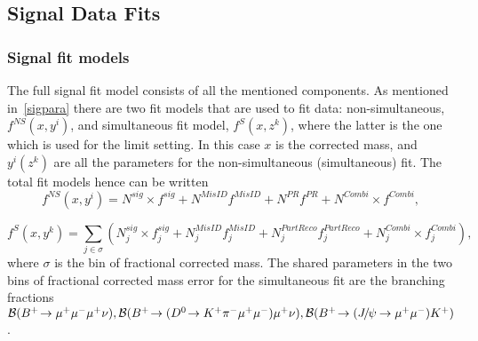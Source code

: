 %
%
\subsection{Signal Data Fits}
\label{fitsens}


\subsubsection{Signal fit models}
The full signal fit model consists of all the mentioned components. As mentioned in~\autoref{sigpara} there are two fit models that are used to fit data: non-simultaneous, $f^{NS}(x,y^{i})$, and simultaneous fit model, $f^{S}(x,{z^{k}})$, where the latter is the one which is used for the limit setting. In this case $x$ is the corrected mass, and $y^{i}(z^{k})$ are all the parameters for the non-simultaneous (simultaneous) fit. The total fit models hence can be written 
\begin{equation}
f^{NS}(x,y^{i})=N^{sig}\times f^{sig} + N^{MisID}f^{MisID} + N^{PR}f^{PR} + N^{Combi} \times f^{Combi},
\label{eq:fullhypo}
\end{equation}

\begin{equation}
f^{S}(x,y^{k})=\sum_{j\in{\sigma}}(N_{j}^{sig}\times f_{j}^{sig} + N_{j}^{MisID}f_{j}^{MisID} + N_{j}^{PartReco}f_{j}^{PartReco} + N_{j}^{Combi} \times f_{j}^{Combi}),
\label{eq:fullhypo2}
\end{equation}
where $\sigma$ is the bin of fractional corrected mass. The shared parameters in the two bins of fractional corrected mass error for the simultaneous fit are the branching fractions $\mathcal{B}({{{B}^+}}\!\rightarrow {\ensuremath{\mu^+\mu^-\mu^+}}\nu),\mathcal{B}({{{B}^+}}\!\rightarrow ({{D}^0}\!\rightarrow {\ensuremath{{K}^+}}{\ensuremath{{\pi}^-}}{\ensuremath{\mu^+\mu^-}}){\mu^+}\nu),\mathcal{B}({{{B}^+}}\!\rightarrow ({{J\mskip -3mu/\mskip -2mu\psi\mskip 2mu}}\!\rightarrow {\ensuremath{\mu^+\mu^-}}){{K}^+})$. 

